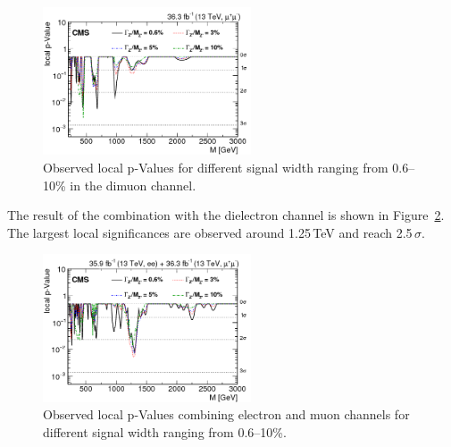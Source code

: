 \begin{figure}[htbp]
\centering
\includegraphics[width=0.55\textwidth]{Images/Cap5/pValue_mm} 
\caption{Observed local p-Values for different signal width ranging from 0.6--10\% in the dimuon channel.}
\label{fig:pValues}
\end{figure}

The result of the combination with the dielectron channel is shown in Figure~\ref{fig:pValuesCombined}. The largest local significances are observed around 1.25\,TeV and reach 2.5\,$\sigma$.

\begin{figure}[htbp]
\centering
\includegraphics[width=0.55\textwidth]{Images/Cap5/pValue_mmee} 
\caption{Observed local p-Values combining electron and muon channels for different signal width ranging from 0.6--10\%.}
\label{fig:pValuesCombined}
\end{figure}

